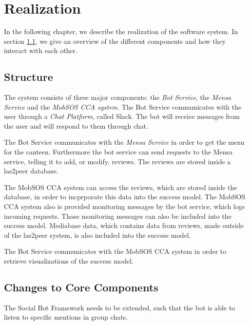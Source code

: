 \chapter{Realization}

In the following chapter, we describe the realization of the software system. In section \ref{sec:structure}, we give an overview of the different components and how they interact with each other.

\section{Structure}\label{sec:structure}

The system consists of three major components: the \emph{Bot Service}, the \emph{Mensa Service} and the \emph{MobSOS CCA system}. The Bot Service communicates with the user through a \emph{Chat Platform}, called Slack. The bot will receice messages from the user and will respond to them through chat.

The Bot Service communicates with the \emph{Mensa Service} in order to get the menu for the canteen. Furthermore the bot service can send requests to the Mensa service, telling it to add, or modify, reviews. The reviews are stored inside a las2peer database.

The MobSOS CCA system can access the reviews, which are stored inside the database, in order to incprporate this data into the success model. The MobSOS CCA system also is provided monitoring messages by the bot service, which logs incoming requests. Those monitoring messages can also be included into the success model. Mediabase data, which contains data from reviews, made outside of the las2peer system, is also included into the success model.

The Bot Service communicates with the MobSOS CCA system in order to retrieve visualizations of the success model.


\section{Changes to Core Components}

The Social Bot Framework needs to be extended, such that the bot is able to listen to specific mentions in group chats.